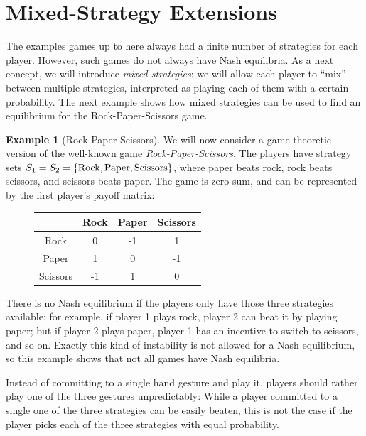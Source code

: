 \documentclass[a4paper]{scrreprt}
\theoremstyle{definition}
\newtheorem{ex}[thm]{Example} %
\begin{document}
    \section{Mixed-Strategy Extensions}
    The examples games up to here always had a finite number of strategies for each player.
    However, such games do not always have Nash equilibria. As a next concept, we will introduce \emph{mixed strategies}: we will allow each player to “mix” between multiple strategies, interpreted as playing each of them with a certain probability.
    The next example shows how mixed strategies can be used to find an equilibrium for the Rock-Paper-Scissors game.
    
    \begin{ex}[Rock-Paper-Scissors]
        We will now consider a game-theoretic version of the well-known game \emph{Rock-Paper-Scissors}.
        The players have strategy sets $S_1 = S_2 = \{\text{Rock}, \text{Paper}, \text{Scissors}\}$, where paper beats rock, rock beats scissors, and scissors beats paper. The game is zero-sum, and can be represented by the first player's payoff matrix:
        \begin{figure}[h]
            \centering
            \begin{tabular}{c|c|c|c|}
            	         & Rock & Paper & Scissors \\ \hline
            	  Rock   &  0   &  -1   &    1     \\ \hline
            	 Paper   &  1   &   0   &    -1    \\ \hline
            	Scissors &  -1  &   1   &    0     \\ \hline
            \end{tabular}
        \end{figure}
    
        There is no Nash equilibrium if the players only have those three strategies available: for example, if player 1 plays rock, player 2 can beat it by playing paper; but if player 2 plays paper, player 1 has an incentive to switch to scissors, and so on. Exactly this kind of instability is not allowed for a Nash equilibrium, so this example shows that not all games have Nash equilibria.
        
        Instead of committing to a single hand gesture and play it, players should rather play one of the three gestures unpredictably: While a player committed to a single one of the three strategies can be easily beaten, this is not the case if the player picks each of the three strategies with equal probability.
        \label{ex:rockPaperScissors}
    \end{ex}
\end{document}
